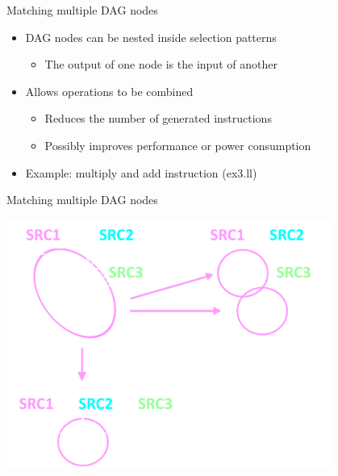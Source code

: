 \begin{frame}[fragile]{Matching multiple DAG nodes}

\begin{itemize}
    \item DAG nodes can be nested inside selection patterns
    \begin{itemize}
        \item The output of one node is the input of another
    \end{itemize}
    \item Allows operations to be combined
    \begin{itemize}
        \item Reduces the number of generated instructions
        \item Possibly improves performance or power consumption
    \end{itemize}
    \item Example: multiply and add instruction (ex3.ll)
\end{itemize}


\end{frame}


\begin{frame}[fragile]{Matching multiple DAG nodes}

\includegraphics[width = 0.80\textwidth]{examples/ex3/ex3-isel-comparison.pdf}

\end{frame}

